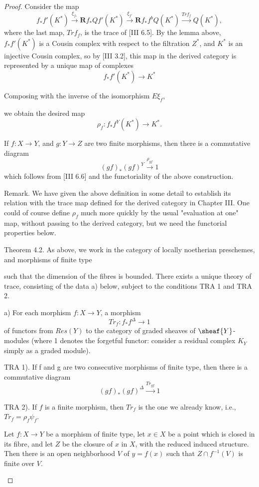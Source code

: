 \documentclass[12pt]{book}
\begin{document}
\begin{proof}
Consider the map
\[f_{*} f'\left(K^{*}\right) \stackrel{\xi_{f_{*}}}{\to} \mathbf{R} f_{*} Q f'\left(K^{*}\right) \stackrel{\xi_{f'}}{\to} \mathbf{R} f_{*} f^{b} Q\left(K^{*}\right) \stackrel{Tr f_{f}}{\to} Q\left(K^{*}\right),\]
where the last map, \(Trf_{f}\), is the trace of [III 6.5]. By the lemma above, \(f_{*} f'(K^{*})\) is a Cousin complex with respect to the filtration \(Z^{*}\), and \(K^{*}\) is an injective Cousin complex, so by [III 3.2], this map in the derived category is represented by a unique map of complexes
\[f_{*} f'\left(K^{*}\right) \to K^{*}\]

Composing with the inverse of the isomorphism \(E \xi_{f}\),

\setcounter{page}{339}
we obtain the desired map
\[\rho_{f}: f_{*} f^{Y}\left(K^{*}\right) \to K^{*} .\]

If \(f: X \to Y\), and \(g: Y \to Z\) are two finite morphisms, then there is a commutative diagram
\[(g f)_{*}(g f)^{Y} \stackrel{\rho_{g f}}{\to} 1\]
which follows from [III 6.6] and the functoriality of the above construction.

Remark. We have given the above definition in some detail to establish its relation with the trace map defined for the derived category in Chapter III. One could of course define \(\rho_{f}\) much more quickly by the usual "evaluation at one" map, without passing to the derived category, but we need the functorial properties below.

Theorem 4.2. As above, we work in the category of locally noetherian preschemes, and morphisms of finite type

\setcounter{page}{340}
such that the dimension of the fibres is bounded. There exists a unique theory of trace, consisting of the data a) below, subject to the conditions TRA 1 and TRA 2.

a) For each morphism \(f: X \to Y\), a morphism
\[Tr_{f}: f_{*} f^{\Delta} \to 1\]
of functors from \(Res(Y)\) to the category of graded sheaves of \(\sheaf{Y}\)-modules (where 1 denotes the forgetful functor: consider a residual complex \(K_{Y}\) simply as a graded module).

TRA 1). If f and g are two consecutive morphisms of finite type, then there is a commutative diagram
\[(g f)_{*}(g f)^{\Delta} \stackrel{Tr_{g f}}{\to} 1\]

TRA 2). If \(f\) is a finite morphism, then \(Tr_{f}\) is the one we already know, i.e., \(Tr_{f}=\rho_{f} \psi_{f}\).

\setcounter{page}{341}
\begin{lemma}
Let \(f: X \to Y\) be a morphism of finite type, let \(x \in X\) be a point which is closed in its fibre, and let \(Z\) be the closure of \(x\) in \(X\), with the reduced induced structure. Then there is an open neighborhood \(V\) of \(y=f(x)\) such that \(Z \cap f^{-1}(V)\) is finite over \(V\).
\end{lemma}


\end{proof}
\end{document}
